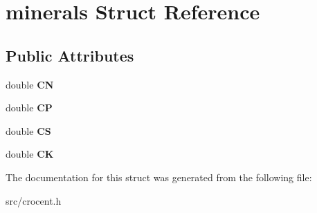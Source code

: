 \hypertarget{structminerals}{\section{minerals Struct Reference}
\label{structminerals}
}
\subsection*{Public Attributes}
\begin{DoxyCompactItemize}
\item 
\hypertarget{structminerals_af5bb89b56fce9b3a50d2c269a00696ba}{double {\bfseries C\-N}}\label{structminerals_af5bb89b56fce9b3a50d2c269a00696ba}

\item 
\hypertarget{structminerals_a3601be37e549eb909c5aa472a0b4dc93}{double {\bfseries C\-P}}\label{structminerals_a3601be37e549eb909c5aa472a0b4dc93}

\item 
\hypertarget{structminerals_ac274b2490920995e1bcd425f24431150}{double {\bfseries C\-S}}\label{structminerals_ac274b2490920995e1bcd425f24431150}

\item 
\hypertarget{structminerals_af6e57989e76d076534d457e38a620bc3}{double {\bfseries C\-K}}\label{structminerals_af6e57989e76d076534d457e38a620bc3}

\end{DoxyCompactItemize}


The documentation for this struct was generated from the following file\-:\begin{DoxyCompactItemize}
\item 
src/crocent.\-h\end{DoxyCompactItemize}
